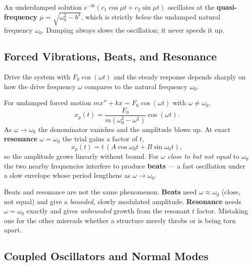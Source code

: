 \begin{warningbox}
An underdamped solution $e^{-bt}(c_1\cos\mu t + c_2\sin\mu t)$ oscillates at the
\textbf{quasi-frequency} $\mu = \sqrt{\omega_0^{2}-b^{2}}$, which is strictly
\emph{below} the undamped natural frequency $\omega_0$. Damping always slows the
oscillation; it never speeds it up.
\end{warningbox}

\subsection{Forced Vibrations, Beats, and Resonance}

Drive the system with $F_0\cos(\omega t)$ and the steady response depends sharply on
how the drive frequency $\omega$ compares to the natural frequency $\omega_0$.

\begin{formulabox}
For undamped forced motion $m x'' + k x = F_0\cos(\omega t)$ with $\omega\neq\omega_0$,
\[ x_p(t) = \frac{F_0}{m(\omega_0^{2}-\omega^{2})}\cos(\omega t). \]
As $\omega \to \omega_0$ the denominator vanishes and the amplitude blows up. At
exact \textbf{resonance} $\omega=\omega_0$ the trial gains a factor of $t$,
\[ x_p(t) = t\,(A\cos\omega_0 t + B\sin\omega_0 t), \]
so the amplitude grows linearly without bound. For $\omega$ \emph{close to but not
equal} to $\omega_0$ the two nearby frequencies interfere to produce \textbf{beats}
--- a fast oscillation under a slow envelope whose period lengthens as
$\omega\to\omega_0$.
\end{formulabox}

\begin{warningbox}
Beats and resonance are not the same phenomenon. \textbf{Beats} need
$\omega \approx \omega_0$ (close, not equal) and give a \emph{bounded}, slowly
modulated amplitude. \textbf{Resonance} needs $\omega = \omega_0$ exactly and gives
\emph{unbounded} growth from the resonant $t$ factor. Mistaking one for the other
misreads whether a structure merely throbs or is being torn apart.
\end{warningbox}

\subsection{Coupled Oscillators and Normal Modes}


